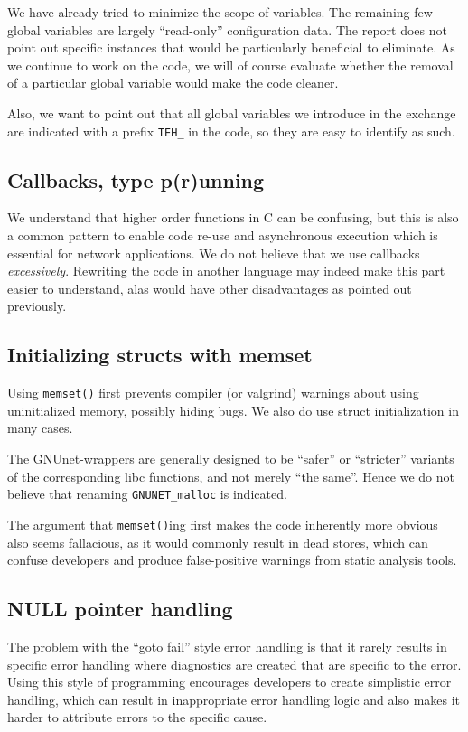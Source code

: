\documentclass[11pt]{article}
\begin{document}
We have already tried to minimize the scope of variables. The remaining few
global variables are largely ``read-only'' configuration data. The report does
not point out specific instances that would be particularly beneficial to
eliminate. As we continue to work on the code, we will of course evaluate
whether the removal of a particular global variable would make the code
cleaner.

Also, we want to point out that all global variables we introduce
in the exchange are indicated with a prefix {\tt TEH\_} in the code, so they
are easy to identify as such.

\subsection{Callbacks, type p(r)unning}

We understand that higher order functions in C can be confusing, but this
is also a common pattern to enable code re-use and asynchronous execution
which is essential for network applications. We do not believe that we
use callbacks {\em excessively}.  Rewriting the code in another language
may indeed make this part easier to understand, alas would have other
disadvantages as pointed out previously.

\subsection{Initializing structs with memset}

Using {\tt memset()} first prevents compiler (or valgrind) warnings about
using uninitialized memory, possibly hiding bugs. We also do use struct
initialization in many cases.

The GNUnet-wrappers are generally designed to be ``safer'' or ``stricter''
variants of the corresponding libc functions, and not merely ``the same''.
Hence we do not believe that renaming {\tt GNUNET\_malloc} is indicated.

The argument that {\tt memset()}ing first makes the code inherently more
obvious also seems fallacious, as it would commonly result in dead stores,
which can confuse developers and produce false-positive warnings from static
analysis tools.

\subsection{NULL pointer handling}

The problem with the ``goto fail'' style error handling is that it rarely
results in specific error handling where diagnostics are created that are
specific to the error. Using this style of programming encourages developers
to create simplistic error handling, which can result in inappropriate error
handling logic and also makes it harder to attribute errors to the specific
cause.
\end{document}
